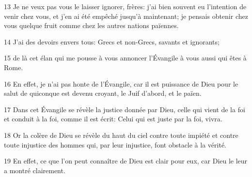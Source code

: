 
13 Je ne veux pas vous le laisser ignorer, frères: j’ai bien souvent eu l’intention de venir chez vous, et j’en ai été empêché jusqu’à maintenant; je pensais obtenir chez vous quelque fruit comme chez les autres nations païennes.

14 J’ai des devoirs envers tous: Grecs et non-Grecs, savants et ignorants;

15 de là cet élan qui me pousse à vous annoncer l’Évangile à vous aussi qui êtes à Rome.

16 En effet, je n’ai pas honte de l’Évangile, car il est puissance de Dieu pour le salut de quiconque est devenu croyant, le Juif d’abord, et le païen.

17 Dans cet Évangile se révèle la justice donnée par Dieu, celle qui vient de la foi et conduit à la foi, comme il est écrit: Celui qui est juste par la foi, vivra.

18 Or la colère de Dieu se révèle du haut du ciel contre toute impiété et contre toute injustice des hommes qui, par leur injustice, font obstacle à la vérité.

19 En effet, ce que l’on peut connaître de Dieu est clair pour eux, car Dieu le leur a montré clairement.